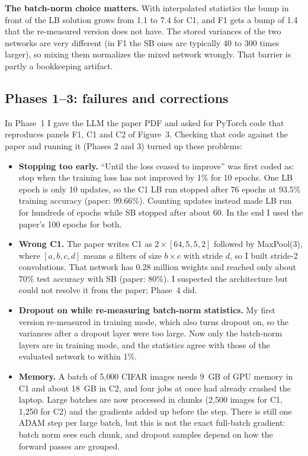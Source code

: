 \textbf{The batch-norm choice matters.} With interpolated statistics the bump in front of the LB solution grows from 1.1 to 7.4 for C1, and F1 gets a bump of 1.4 that the re-measured version does not have. The stored variances of the two networks are very different (in F1 the SB ones are typically 40 to 300 times larger), so mixing them normalizes the mixed network wrongly. That barrier is partly a bookkeeping artifact.

\subsection{Phases 1--3: failures and corrections}
In Phase~1 I gave the LLM the paper PDF and asked for PyTorch code that reproduces panels F1, C1 and C2 of Figure~3. Checking that code against the paper and running it (Phases 2 and 3) turned up these problems:
\begin{itemize}
  \item \textbf{Stopping too early.} ``Until the loss ceased to improve'' was first coded as: stop when the training loss has not improved by 1\% for 10 epochs. One LB epoch is only 10 updates, so the C1 LB run stopped after 76 epochs at 93.5\% training accuracy (paper: 99.66\%). Counting updates instead made LB run for hundreds of epochs while SB stopped after about 60. In the end I used the paper's 100 epochs for both.
  \item \textbf{Wrong C1.} The paper writes C1 as $2\times[64,5,5,2]$ followed by MaxPool(3), where $[a,b,c,d]$ means $a$ filters of size $b\times c$ with stride $d$, so I built stride-2 convolutions. That network has 0.28 million weights and reached only about 70\% test accuracy with SB (paper: 80\%). I suspected the architecture but could not resolve it from the paper; Phase~4 did.
  \item \textbf{Dropout on while re-measuring batch-norm statistics.} My first version re-measured in training mode, which also turns dropout on, so the variances after a dropout layer were too large. Now only the batch-norm layers are in training mode, and the statistics agree with those of the evaluated network to within 1\%.
  \item \textbf{Memory.} A batch of 5{,}000 CIFAR images needs 9~GB of GPU memory in C1 and about 18~GB in C2, and four jobs at once had already crashed the laptop. Large batches are now processed in chunks (2{,}500 images for C1, 1{,}250 for C2) and the gradients added up before the step. There is still one ADAM step per large batch, but this is not the exact full-batch gradient: batch norm sees each chunk, and dropout samples depend on how the forward passes are grouped.
\end{itemize}

